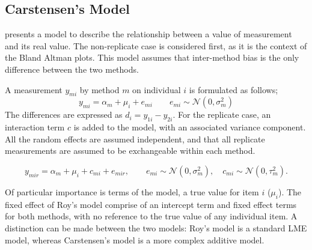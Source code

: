 \documentclass{report}
\begin{document}
\subsection{Carstensen's Model}

\citet{BXC2004} presents a model to describe the relationship between a value of measurement and its
real value. The non-replicate case is considered first, as it is the context of the Bland Altman plots. This model assumes that inter-method bias is the only difference between the two methods.

A measurement $y_{mi}$ by method $m$ on individual $i$ is formulated as follows;
\begin{equation}
y_{mi}  = \alpha_{m} + \mu_{i} + e_{mi} \qquad  e_{mi} \sim
\mathcal{N}(0,\sigma^{2}_{m})
\end{equation}
The differences are expressed as $d_{i} = y_{1i} - y_{2i}$. For the replicate case, an interaction term $c$ is added to the model, with an associated variance component. All the random effects are assumed independent, and that all replicate measurements are assumed to be exchangeable within each method.

\begin{equation}
y_{mir}  = \alpha_{m} + \mu_{i} + c_{mi} + e_{mir}, \qquad  e_{mi}
\sim \mathcal{N}(0,\sigma^{2}_{m}), \quad c_{mi} \sim \mathcal{N}(0,\tau^{2}_{m}).
\end{equation}

Of particular importance is terms of the model, a true value for item $i$ ($\mu_{i}$).  The fixed effect of Roy's model comprise of an intercept term and fixed effect terms for both methods, with no reference to the true value of any individual item. A distinction can be made between the two models: Roy's model is a standard LME model, whereas Carstensen's model is a more complex additive model.
\end{document}

